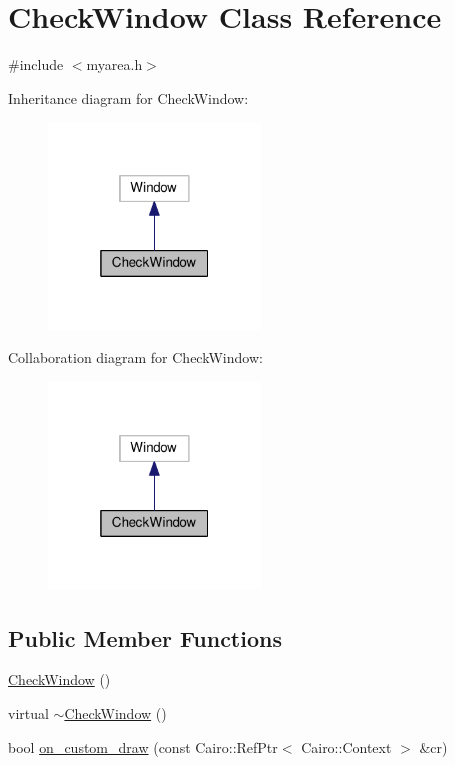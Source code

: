 \hypertarget{class_check_window}{}\section{Check\+Window Class Reference}
\label{class_check_window}


{\ttfamily \#include $<$myarea.\+h$>$}



Inheritance diagram for Check\+Window\+:
\nopagebreak
\begin{figure}[H]
\begin{center}
\leavevmode
\includegraphics[width=160pt]{class_check_window__inherit__graph}
\end{center}
\end{figure}


Collaboration diagram for Check\+Window\+:
\nopagebreak
\begin{figure}[H]
\begin{center}
\leavevmode
\includegraphics[width=160pt]{class_check_window__coll__graph}
\end{center}
\end{figure}
\subsection*{Public Member Functions}
\begin{DoxyCompactItemize}
\item 
\hyperlink{class_check_window_ad7f421b24dae2b2f97173d75616a3448}{Check\+Window} ()
\item 
virtual \hyperlink{class_check_window_ae22d2cdd07681f597511574810dca673}{$\sim$\+Check\+Window} ()
\item 
bool \hyperlink{class_check_window_aa156d4ed4a30659981e70aef4f49d015}{on\+\_\+custom\+\_\+draw} (const Cairo\+::\+Ref\+Ptr$<$ Cairo\+::\+Context $>$ \&cr)
\end{DoxyCompactItemize}
